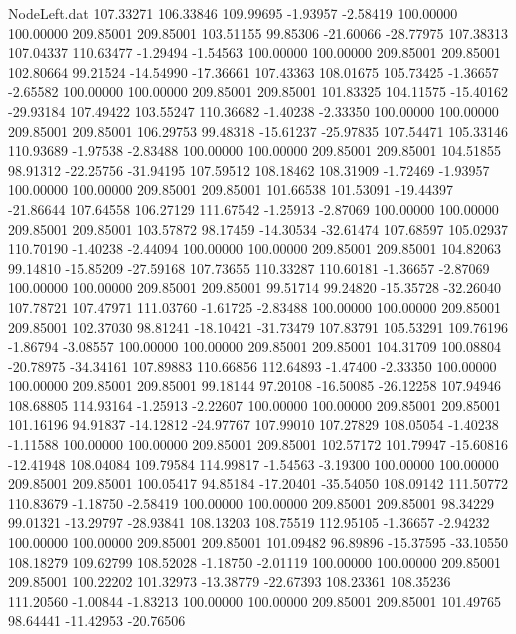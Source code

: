 \begin{filecontents}{NodeLeft.dat}
 107.33271  106.33846  109.99695    -1.93957   -2.58419  100.00000  100.00000  209.85001  209.85001  103.51155   99.85306  -21.60066  -28.77975
 107.38313  107.04337  110.63477    -1.29494   -1.54563  100.00000  100.00000  209.85001  209.85001  102.80664   99.21524  -14.54990  -17.36661
 107.43363  108.01675  105.73425    -1.36657   -2.65582  100.00000  100.00000  209.85001  209.85001  101.83325  104.11575  -15.40162  -29.93184
 107.49422  103.55247  110.36682    -1.40238   -2.33350  100.00000  100.00000  209.85001  209.85001  106.29753   99.48318  -15.61237  -25.97835
 107.54471  105.33146  110.93689    -1.97538   -2.83488  100.00000  100.00000  209.85001  209.85001  104.51855   98.91312  -22.25756  -31.94195
 107.59512  108.18462  108.31909    -1.72469   -1.93957  100.00000  100.00000  209.85001  209.85001  101.66538  101.53091  -19.44397  -21.86644
 107.64558  106.27129  111.67542    -1.25913   -2.87069  100.00000  100.00000  209.85001  209.85001  103.57872   98.17459  -14.30534  -32.61474
 107.68597  105.02937  110.70190    -1.40238   -2.44094  100.00000  100.00000  209.85001  209.85001  104.82063   99.14810  -15.85209  -27.59168
 107.73655  110.33287  110.60181    -1.36657   -2.87069  100.00000  100.00000  209.85001  209.85001   99.51714   99.24820  -15.35728  -32.26040
 107.78721  107.47971  111.03760    -1.61725   -2.83488  100.00000  100.00000  209.85001  209.85001  102.37030   98.81241  -18.10421  -31.73479
 107.83791  105.53291  109.76196    -1.86794   -3.08557  100.00000  100.00000  209.85001  209.85001  104.31709  100.08804  -20.78975  -34.34161
 107.89883  110.66856  112.64893    -1.47400   -2.33350  100.00000  100.00000  209.85001  209.85001   99.18144   97.20108  -16.50085  -26.12258
 107.94946  108.68805  114.93164    -1.25913   -2.22607  100.00000  100.00000  209.85001  209.85001  101.16196   94.91837  -14.12812  -24.97767
 107.99010  107.27829  108.05054    -1.40238   -1.11588  100.00000  100.00000  209.85001  209.85001  102.57172  101.79947  -15.60816  -12.41948
 108.04084  109.79584  114.99817    -1.54563   -3.19300  100.00000  100.00000  209.85001  209.85001  100.05417   94.85184  -17.20401  -35.54050
 108.09142  111.50772  110.83679    -1.18750   -2.58419  100.00000  100.00000  209.85001  209.85001   98.34229   99.01321  -13.29797  -28.93841
 108.13203  108.75519  112.95105    -1.36657   -2.94232  100.00000  100.00000  209.85001  209.85001  101.09482   96.89896  -15.37595  -33.10550
 108.18279  109.62799  108.52028    -1.18750   -2.01119  100.00000  100.00000  209.85001  209.85001  100.22202  101.32973  -13.38779  -22.67393
 108.23361  108.35236  111.20560    -1.00844   -1.83213  100.00000  100.00000  209.85001  209.85001  101.49765   98.64441  -11.42953  -20.76506

\end{filecontents}
